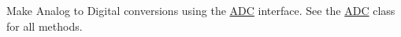 Make Analog to Digital conversions using the \mbox{\hyperlink{class_a_d_c}{A\+DC}} interface. See the \mbox{\hyperlink{class_a_d_c}{A\+DC}} class for all methods. 